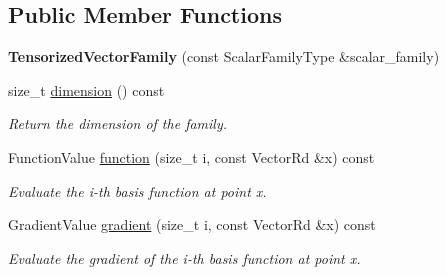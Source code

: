 \subsection*{Public Member Functions}
\begin{DoxyCompactItemize}
\item 
\mbox{\label{classHArDCore2D_1_1TensorizedVectorFamily_afbbde5d4b671418870cbbd903a0a409b}} 
{\bfseries Tensorized\+Vector\+Family} (const Scalar\+Family\+Type \&scalar\+\_\+family)
\item 
\mbox{\label{classHArDCore2D_1_1TensorizedVectorFamily_abdcbe0043887c0aa46065409f1731a83}} 
size\+\_\+t \hyperlink{classHArDCore2D_1_1TensorizedVectorFamily_abdcbe0043887c0aa46065409f1731a83}{dimension} () const
\begin{DoxyCompactList}\small\item\em Return the dimension of the family. \end{DoxyCompactList}\item 
\mbox{\label{classHArDCore2D_1_1TensorizedVectorFamily_a52d9aaac677abb3a81b32c5542e55ea4}} 
Function\+Value \hyperlink{classHArDCore2D_1_1TensorizedVectorFamily_a52d9aaac677abb3a81b32c5542e55ea4}{function} (size\+\_\+t i, const Vector\+Rd \&x) const
\begin{DoxyCompactList}\small\item\em Evaluate the i-\/th basis function at point x. \end{DoxyCompactList}\item 
\mbox{\label{classHArDCore2D_1_1TensorizedVectorFamily_a46500da07e2cb4cfe8ead5ffe8dbc586}} 
Gradient\+Value \hyperlink{classHArDCore2D_1_1TensorizedVectorFamily_a46500da07e2cb4cfe8ead5ffe8dbc586}{gradient} (size\+\_\+t i, const Vector\+Rd \&x) const
\begin{DoxyCompactList}\small\item\em Evaluate the gradient of the i-\/th basis function at point x. \end{DoxyCompactList}\item 
\mbox{\label{classHArDCore2D_1_1TensorizedVectorFamily_a187befd7daa85ec049e41706ea1d5de2}} 

\end{DoxyCompactItemize}
